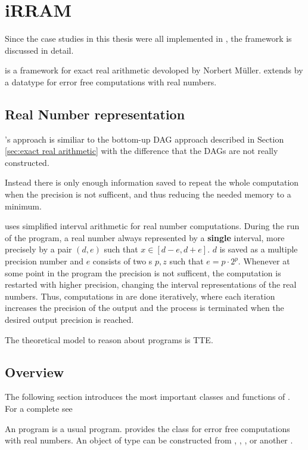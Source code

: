 \section{iRRAM}
	Since the case studies in this thesis were all implemented  in \irram, the \irram framework 
	is discussed in detail.

	\irram is a \cc framework for exact real arithmetic devoloped by Norbert M\"uller.
	\irram extends \cc by a datatype \real for error free computations with real numbers.
	\subsection{Real Number representation}
		\irram's approach is similiar to the bottom-up DAG approach described in Section \ref{sec:exact real arithmetic}
		with the difference that the DAGs are not really constructed.

		Instead there is only enough information saved to repeat the whole computation when the precision is not sufficent, and thus reducing the needed memory to a minimum.

		\irram uses simplified interval arithmetic for real number computations.
		During the run of the program, a real number always represented by a \textbf{single} interval, more precisely by a pair $(d,e)$ such that $x \in [d-e, d+e]$.
 		$d$ is saved as a multiple precision number and $e$ consists of two s $p,z$ such that $e = p \cdot 2^p$.
 		Whenever at some point in the program the precision is not sufficent, the computation is restarted with higher precision, 
 		changing the interval representations of the real numbers.
 		Thus, computations in \irram are done iteratively, where each iteration increases the precision of the output and the process is terminated when the desired output precision is reached. 

 		The theoretical model to reason about \irram programs is TTE.
	\subsection{Overview}
		The following section introduces the most important classes and functions of \irram. 
		For a complete see
		
		An \irram program is a usual \cc program.
		\irram provides the class \real for error free computations with real numbers.
		An object of type \real can be constructed from , , ,  
		or another \real. 


